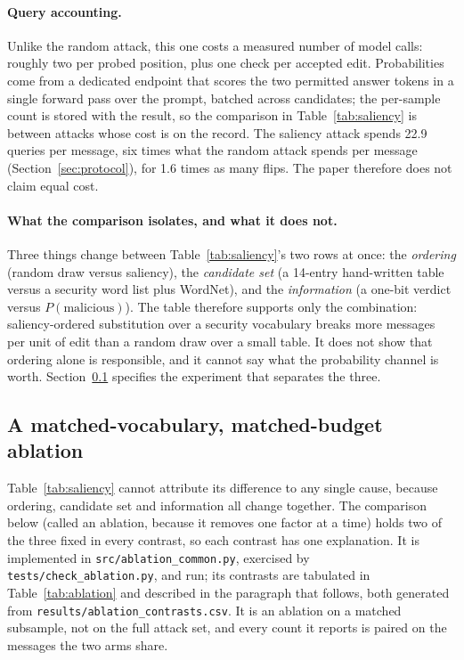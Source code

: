 \paragraph{Query accounting.} Unlike the random attack, this one costs a measured
number of model calls: roughly two per probed position, plus one check per
accepted edit. Probabilities come from a dedicated endpoint that scores the two
permitted answer tokens in a single forward pass over the prompt, batched across
candidates; the per-sample count is stored with the result, so the comparison in
Table~\ref{tab:saliency} is between attacks whose cost is on the record. The
saliency attack spends 22.9 queries per message, six times what the random attack
spends per message (Section~\ref{sec:protocol}), for 1.6 times as many flips. The paper
therefore does not claim equal cost.

\paragraph{What the comparison isolates, and what it does not.} Three things
change between Table~\ref{tab:saliency}'s two rows at once: the \emph{ordering}
(random draw versus saliency), the \emph{candidate set} (a 14-entry hand-written
table versus a security word list plus WordNet), and the \emph{information}
(a one-bit verdict versus $P(\text{malicious})$). The table therefore supports
only the combination: saliency-ordered substitution over a security vocabulary
breaks more messages per unit of edit than a random draw over a small table. It
does not show that ordering alone is responsible, and it cannot say what the
probability channel is worth. Section~\ref{sec:ablation} specifies the experiment that
separates the three.




\subsection{A matched-vocabulary, matched-budget ablation}
\label{sec:ablation}

Table~\ref{tab:saliency} cannot attribute its difference to any single cause,
because ordering, candidate set and information all change together. The
comparison below (called an ablation, because it removes one factor at a time)
holds two of the three fixed in every contrast, so each contrast has one
explanation. It is implemented in \texttt{src/ablation\_common.py}, exercised by
\texttt{tests/check\_ablation.py}, and run; its contrasts are
tabulated in Table~\ref{tab:ablation} and described in the paragraph that
follows, both generated from \texttt{results/ablation\_contrasts.csv}. It is an ablation on a matched
subsample, not on the full attack set, and every count it reports is paired on
the messages the two arms share.

